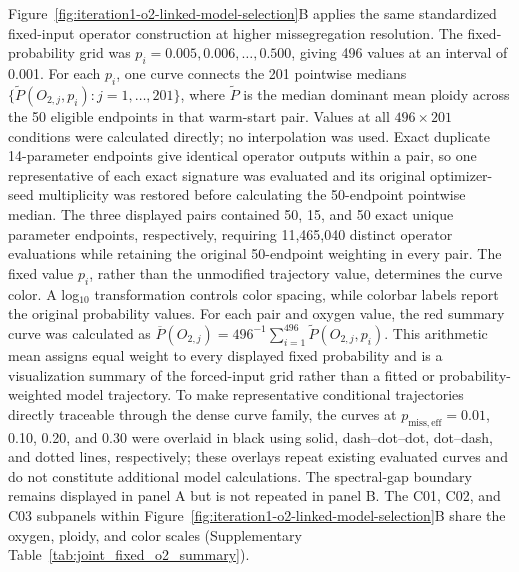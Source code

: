\documentclass[11pt]{article}
\begin{document}
Figure~\ref{fig:iteration1-o2-linked-model-selection}B applies the same standardized fixed-input operator construction at higher missegregation resolution. The fixed-probability grid was \(p_i=0.005,0.006,\ldots,0.500\), giving 496 values at an interval of 0.001. For each \(p_i\), one curve connects the 201 pointwise medians \(\{\widetilde{P}(O_{2,j},p_i):j=1,\ldots,201\}\), where \(\widetilde{P}\) is the median dominant mean ploidy across the 50 eligible endpoints in that warm-start pair. Values at all \(496\times201\) conditions were calculated directly; no interpolation was used. Exact duplicate 14-parameter endpoints give identical operator outputs within a pair, so one representative of each exact signature was evaluated and its original optimizer-seed multiplicity was restored before calculating the 50-endpoint pointwise median. The three displayed pairs contained 50, 15, and 50 exact unique parameter endpoints, respectively, requiring 11,465,040 distinct operator evaluations while retaining the original 50-endpoint weighting in every pair. The fixed value \(p_i\), rather than the unmodified trajectory value, determines the curve color. A log$_{10}$ transformation controls color spacing, while colorbar labels report the original probability values. For each pair and oxygen value, the red summary curve was calculated as \(\overline{P}(O_{2,j})=496^{-1}\sum_{i=1}^{496}\widetilde{P}(O_{2,j},p_i)\). This arithmetic mean assigns equal weight to every displayed fixed probability and is a visualization summary of the forced-input grid rather than a fitted or probability-weighted model trajectory. To make representative conditional trajectories directly traceable through the dense curve family, the curves at \(p_{\mathrm{miss,eff}}=0.01\), 0.10, 0.20, and 0.30 were overlaid in black using solid, dash--dot--dot, dot--dash, and dotted lines, respectively; these overlays repeat existing evaluated curves and do not constitute additional model calculations. The spectral-gap boundary remains displayed in panel A but is not repeated in panel B. The C01, C02, and C03 subpanels within Figure~\ref{fig:iteration1-o2-linked-model-selection}B share the oxygen, ploidy, and color scales (Supplementary Table~\ref{tab:joint_fixed_o2_summary}).
\end{document}
